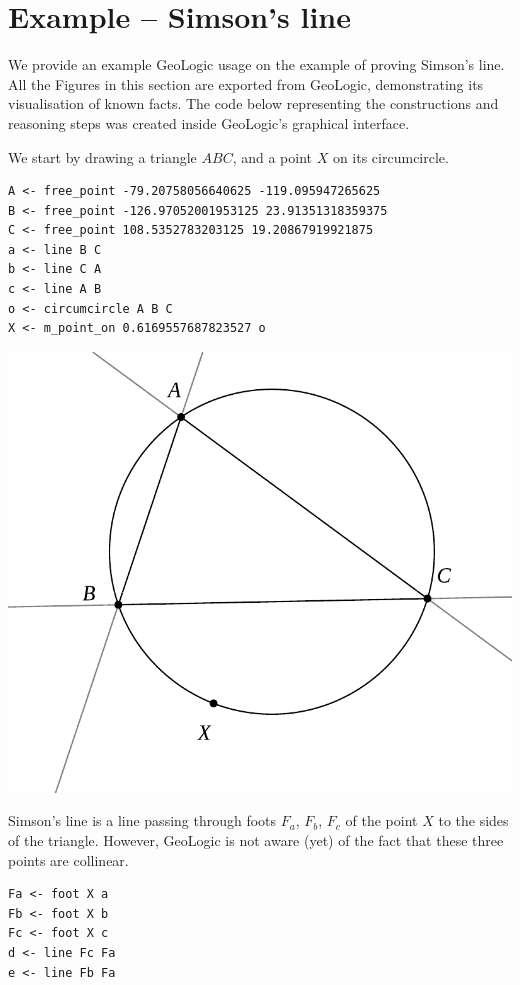 \documentclass[runningheads]{llncs}
\begin{document}
\section{Example -- Simson's line}

We provide an example GeoLogic usage on the example of proving Simson's line.
All the Figures in this section are exported from GeoLogic,
demonstrating its visualisation of known facts. The code below
representing the constructions and reasoning steps was created inside
GeoLogic's graphical interface.

We start by drawing a triangle $ABC$, and a point $X$ on its
circumcircle.
\begin{verbatim}
A <- free_point -79.20758056640625 -119.095947265625
B <- free_point -126.97052001953125 23.91351318359375
C <- free_point 108.5352783203125 19.20867919921875
a <- line B C
b <- line C A
c <- line A B
o <- circumcircle A B C
X <- m_point_on 0.6169557687823527 o
\end{verbatim}

\newdimen\imgwidth
\imgwidth=6cm
\centerline{%
  \includegraphics[width = \imgwidth]{simson1.pdf}%
}

Simson's line is a line passing through foots $F_a$, $F_b$, $F_c$ of
the point $X$ to the sides of the triangle. However, GeoLogic is not
aware (yet) of the fact that these three points are collinear.

\begin{verbatim}
Fa <- foot X a
Fb <- foot X b
Fc <- foot X c
d <- line Fc Fa
e <- line Fb Fa
\end{verbatim}
\end{document}
